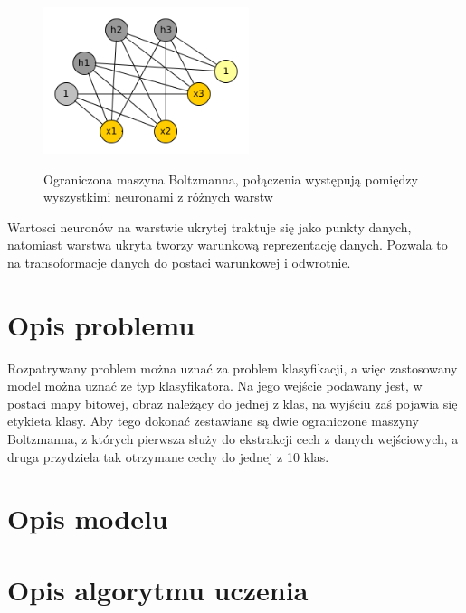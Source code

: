\documentclass[a4paper,10pt]{article} %
\begin{document}
\begin{figure}
 \centering
 \includegraphics[width=6cm]{imgs/rbm.png}
 \label{fig:rbm}
\caption{Ograniczona maszyna Boltzmanna, połączenia występują pomiędzy wyszystkimi neuronami z różnych
warstw}
\end{figure} 

Wartosci neuronów na warstwie ukrytej traktuje się jako punkty danych, natomiast warstwa ukryta tworzy
warunkową reprezentację danych. Pozwala to na transoformacje danych do postaci warunkowej i odwrotnie.

\section{Opis problemu}

Rozpatrywany problem można uznać za problem klasyfikacji, a więc zastosowany model można uznać ze typ klasyfikatora. Na jego wejście podawany jest, w postaci mapy bitowej, obraz należący do jednej z klas, na wyjściu zaś pojawia się etykieta klasy. Aby tego dokonać zestawiane są dwie ograniczone maszyny Boltzmanna, z których pierwsza służy do ekstrakcji cech z danych wejściowych, a druga przydziela tak otrzymane cechy do jednej z 10 klas.

\section{Opis modelu}

\section{Opis algorytmu uczenia}
\end{document}
